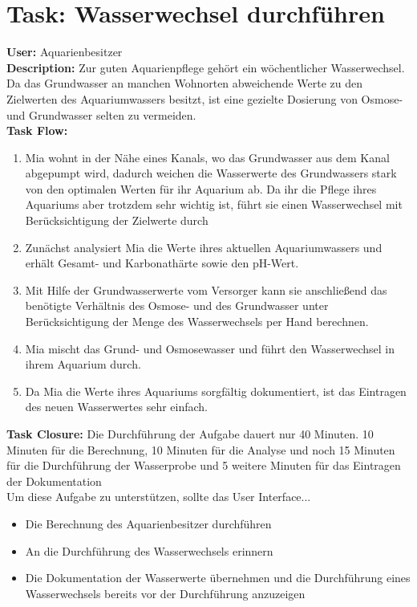 \section{Task: Wasserwechsel durchführen}

\textbf{User:} Aquarienbesitzer\\

\textbf{Description:} Zur guten Aquarienpflege gehört ein wöchentlicher Wasserwechsel. Da das Grundwasser an manchen Wohnorten abweichende Werte zu den Zielwerten des Aquariumwassers besitzt, ist eine gezielte Dosierung von Osmose- und Grundwasser selten zu vermeiden.\\

\textbf{Task Flow:}
\begin{enumerate}
 \item Mia wohnt in der Nähe eines Kanals, wo das Grundwasser aus dem Kanal abgepumpt wird, dadurch weichen die Wasserwerte des Grundwassers stark von den optimalen Werten für ihr Aquarium ab. Da ihr die Pflege ihres Aquariums aber trotzdem sehr wichtig ist, führt sie einen Wasserwechsel mit Berücksichtigung der Zielwerte durch
 \item Zunächst analysiert Mia die Werte ihres aktuellen Aquariumwassers und erhält Gesamt- und Karbonathärte sowie den pH-Wert.
 \item Mit Hilfe der Grundwasserwerte vom Versorger kann sie anschließend das benötigte Verhältnis des Osmose- und des Grundwasser unter Berücksichtigung der Menge des Wasserwechsels per Hand berechnen.
 \item Mia mischt das Grund- und Osmosewasser und führt den Wasserwechsel in ihrem Aquarium durch.
 \item Da Mia die Werte ihres Aquariums sorgfältig dokumentiert, ist das Eintragen des neuen Wasserwertes sehr einfach.
\end{enumerate}

\textbf{Task Closure:} Die Durchführung der Aufgabe dauert nur 40 Minuten. 10 Minuten für die Berechnung, 10 Minuten für die Analyse und noch 15 Minuten für die Durchführung der Wasserprobe und 5 weitere Minuten für das Eintragen der Dokumentation\\

Um diese Aufgabe zu unterstützen, sollte das User Interface...
\begin{itemize}
  \item Die Berechnung des Aquarienbesitzer durchführen
  \item An die Durchführung des Wasserwechsels erinnern
  \item Die Dokumentation der Wasserwerte übernehmen und die Durchführung eines Wasserwechsels bereits vor der Durchführung anzuzeigen
\end{itemize}